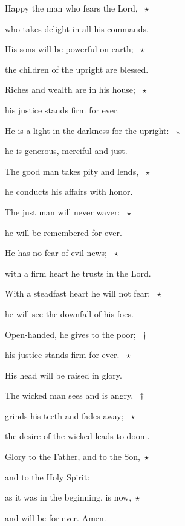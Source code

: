\noindent Happy the man who fears the Lord, ~$\star$~\nopagebreak

who takes delight in all his commands.

\noindent His sons will be powerful on earth; ~$\star$~\nopagebreak

the children of the upright are blessed.

\noindent Riches and wealth are in his house; ~$\star$~\nopagebreak

his justice stands firm for ever.

\noindent He is a light in the darkness for the upright: ~$\star$~\nopagebreak

he is generous, merciful and just.

\noindent The good man takes pity and lends, ~$\star$~\nopagebreak

he conducts his affairs with honor.

\noindent The just man will never waver: ~$\star$~\nopagebreak

he will be remembered for ever.

\noindent He has no fear of evil news; ~$\star$~\nopagebreak

with a firm heart he trusts in the Lord.

\noindent With a steadfast heart he will not fear; ~$\star$~\nopagebreak

he will see the downfall of his foes.

\noindent Open-handed, he gives to the poor; ~†~\nopagebreak

his justice stands firm for ever. ~$\star$~\nopagebreak

His head will be raised in glory.

\noindent The wicked man sees and is angry, ~†~\nopagebreak

grinds his teeth and fades away; ~$\star$~\nopagebreak

the desire of the wicked leads to doom.

\noindent Glory to the Father, and to the Son,~$\star$~\nopagebreak

and to the Holy Spirit:

\noindent as it was in the beginning, is now,~$\star$~\nopagebreak

and will be for ever. Amen.
